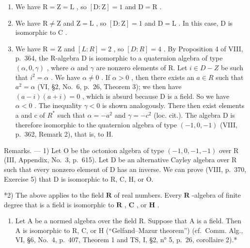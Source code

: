 \begin{enumerate}
\def\labelenumi{\alph{enumi})}
\item
  We have \(\mathrm{R} = \mathrm{Z} = \mathrm{L}\) , so \([\mathrm{D}:\mathrm{Z}] = 1\) and \(\mathrm{D} = \mathrm{R}\) .
\item
  We have \(\mathrm{R} \neq \mathrm{Z}\) and \(\mathrm{Z} = \mathrm{L}\) , so \([\mathrm{D} : \mathrm{Z}] = 1\) and \(\mathrm{D} = \mathrm{L}\) . In this case, \(\mathrm{D}\) is isomorphic to \(\mathrm{C}\) .
\item
  We have R = Z and \([L : R] = 2\) , so \([D : R] = 4\) . By Proposition 4 of VIII, p.~364, the R-algebra D is isomorphic to a quaternion algebra of type \((\alpha, 0, \gamma)\) , where \(\alpha\) and \(\gamma\) are nonzero elements of R. Let \(i \in D - Z\) be such that \(i^{2} = \alpha\) . We have \(\alpha \neq 0\) . If \(\alpha > 0\) , then there exists an \(a \in R\) such that \(a^{2} = \alpha\) (VI, §2, No.~6, p.~26, Theorem 3); we then have \((a - i)(a + i) = 0\) , which is absurd because D is a field. So we have \(\alpha < 0\) . The inequality \(\gamma < 0\) is shown analogously. There then exist elements a and c of \(R^{*}\) such that \(\alpha = -a^{2}\) and \(\gamma = -c^{2}\) (loc. cit.). The algebra D is therefore isomorphic to the quaternion algebra of type \((-1,0,-1)\) (VIII, p.~362, Remark 2), that is, to H.
\end{enumerate}

Remarks. --- 1) Let O be the octonion algebra of type \((-1,0,-1,-1)\) over R (III, Appendix, No.~3, p.~615). Let D be an alternative Cayley algebra over R such that every nonzero element of D has an inverse. We can prove (VIII, p.~370, Exercise 5) that D is isomorphic to R, C, H, or O.

*2) The above applies to the field \(\mathbf{R}\) of real numbers. Every \(\mathbf{R}\) -algebra of finite degree that is a field is isomorphic to \(\mathbf{R}\) , \(\mathbf{C}\) , or \(\mathbf{H}\) .

\begin{enumerate}
\def\labelenumi{\arabic{enumi})}
\setcounter{enumi}{2}
\tightlist
\item
  Let A be a normed algebra over the field R. Suppose that A is a field. Then A is isomorphic to R, C, or H (``Gelfand--Mazur theorem'') (cf.~Comm. Alg., VI, §6, No.~4, p.~407, Theorem 1 and TS, I, §2, n° 5, p.~26, corollaire 2).*
\end{enumerate}

